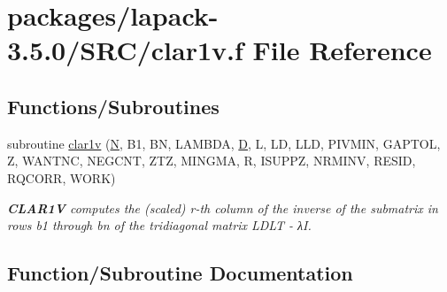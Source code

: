 \hypertarget{clar1v_8f}{}\section{packages/lapack-\/3.5.0/\+S\+R\+C/clar1v.f File Reference}
\label{clar1v_8f}
\subsection*{Functions/\+Subroutines}
\begin{DoxyCompactItemize}
\item 
subroutine \hyperlink{clar1v_8f_ab116247825b9583f0a6e27b2f348e802}{clar1v} (\hyperlink{polmisc_8c_a0240ac851181b84ac374872dc5434ee4}{N}, B1, B\+N, L\+A\+M\+B\+D\+A, \hyperlink{odrpack_8h_a7dae6ea403d00f3687f24a874e67d139}{D}, L, L\+D, L\+L\+D, P\+I\+V\+M\+I\+N, G\+A\+P\+T\+O\+L, Z, W\+A\+N\+T\+N\+C, N\+E\+G\+C\+N\+T, Z\+T\+Z, M\+I\+N\+G\+M\+A, R, I\+S\+U\+P\+P\+Z, N\+R\+M\+I\+N\+V, R\+E\+S\+I\+D, R\+Q\+C\+O\+R\+R, W\+O\+R\+K)
\begin{DoxyCompactList}\small\item\em {\bfseries C\+L\+A\+R1\+V} computes the (scaled) r-\/th column of the inverse of the submatrix in rows b1 through bn of the tridiagonal matrix L\+D\+L\+T -\/ λ\+I. \end{DoxyCompactList}\end{DoxyCompactItemize}


\subsection{Function/\+Subroutine Documentation}
\hypertarget{clar1v_8f_ab116247825b9583f0a6e27b2f348e802}{}
